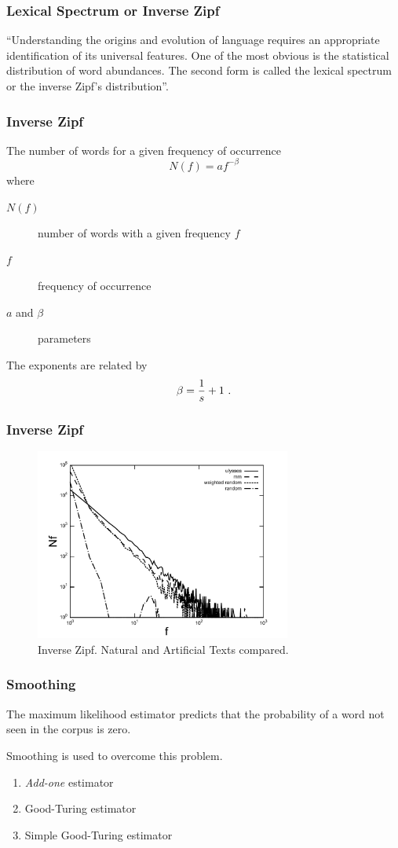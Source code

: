 \documentclass[notes]{beamer}
\begin{document}
\frame
{
  \frametitle{Lexical Spectrum or Inverse Zipf}
  ``Understanding the origins and evolution of language requires an appropriate
  identification of its universal features. One of the most obvious is the statistical 
  distribution of word abundances. The second
  form is called the lexical spectrum or the inverse Zipf’s distribution''\citep{cancho2002}.

}


\frame
{
  \frametitle{Inverse Zipf}
  
  The number of words for a given frequency of occurrence 
  \begin{equation}
  N(f) = a f^{-\beta}
  \end{equation}
  where 
  \begin{description}
  \item[$N(f)$] number of words with a given frequency $f$
  \item[$f$] frequency of occurrence 
  \item[$a$ and $\beta$] parameters
  \end{description}  


  The exponents are related by
  \begin{equation}
  \beta = \frac{1}{s} + 1 \textmd{ .}
  \end{equation}
}


\frame
{
  \frametitle{Inverse Zipf}
  \begin{figure}[h!]
  \centering
  \includegraphics[width=0.75\textwidth]{images/inverse_zipf_ulysses_words.pdf}
  \caption{Inverse Zipf. Natural and Artificial Texts compared.}
  \label{fig:inverse_zipf_ulysses_words}
  \end{figure} 
}


\frame
{
  \frametitle{Smoothing}
  The maximum likelihood estimator predicts that the probability of a word not seen in the
  corpus is zero.

  \vspace{0.3cm}
  Smoothing is used to overcome this problem.
  \begin{enumerate}
  \item \emph{Add-one} estimator \citep{laplace}
  \item Good-Turing estimator \citep{Good1953}
  \item Simple Good-Turing estimator \citep{galesampson95}
  \end{enumerate}
}
\end{document}
